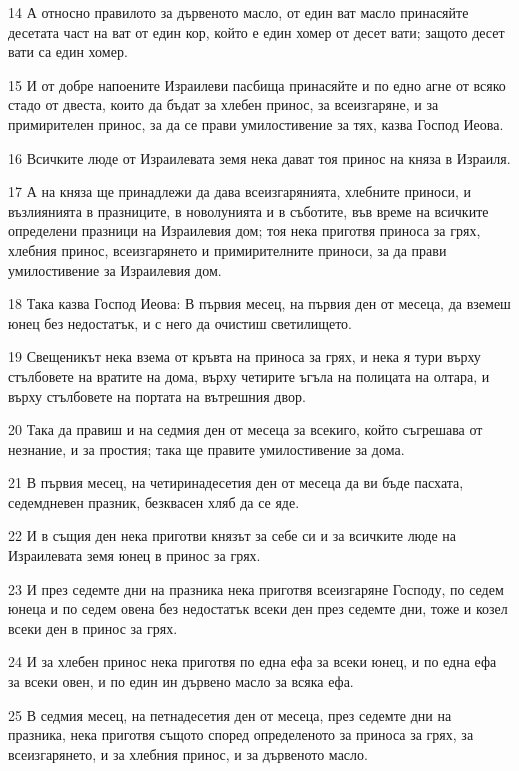 \par 14 А относно правилото за дървеното масло, от един ват масло принасяйте десетата част на ват от един кор, който е един хомер от десет вати; защото десет вати са един хомер.
\par 15 И от добре напоените Израилеви пасбища принасяйте и по едно агне от всяко стадо от двеста, които да бъдат за хлебен принос, за всеизгаряне, и за примирителен принос, за да се прави умилостивение за тях, казва Господ Иеова.
\par 16 Всичките люде от Израилевата земя нека дават тоя принос на княза в Израиля.
\par 17 А на княза ще принадлежи да дава всеизгарянията, хлебните приноси, и възлиянията в празниците, в новолунията и в съботите, във време на всичките определени празници на Израилевия дом; тоя нека приготвя приноса за грях, хлебния принос, всеизгарянето и примирителните приноси, за да прави умилостивение за Израилевия дом.
\par 18 Така казва Господ Иеова: В първия месец, на първия ден от месеца, да вземеш юнец без недостатък, и с него да очистиш светилището.
\par 19 Свещеникът нека взема от кръвта на приноса за грях, и нека я тури върху стълбовете на вратите на дома, върху четирите ъгъла на полицата на олтара, и върху стълбовете на портата на вътрешния двор.
\par 20 Така да правиш и на седмия ден от месеца за всекиго, който съгрешава от незнание, и за простия; така ще правите умилостивение за дома.
\par 21 В първия месец, на четиринадесетия ден от месеца да ви бъде пасхата, седемдневен празник, безквасен хляб да се яде.
\par 22 И в същия ден нека приготви князът за себе си и за всичките люде на Израилевата земя юнец в принос за грях.
\par 23 И през седемте дни на празника нека приготвя всеизгаряне Господу, по седем юнеца и по седем овена без недостатък всеки ден през седемте дни, тоже и козел всеки ден в принос за грях.
\par 24 И за хлебен принос нека приготвя по една ефа за всеки юнец, и по една ефа за всеки овен, и по един ин дървено масло за всяка ефа.
\par 25 В седмия месец, на петнадесетия ден от месеца, през седемте дни на празника, нека приготвя същото според определеното за приноса за грях, за всеизгарянето, и за хлебния принос, и за дървеното масло.

